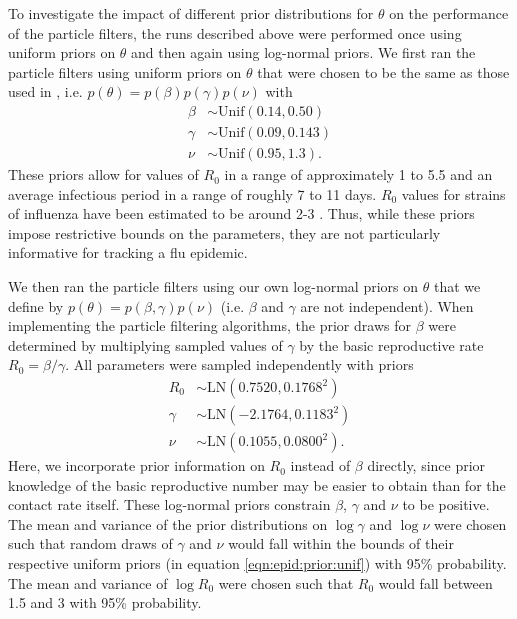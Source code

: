To investigate the impact of different prior distributions for $\theta$ on the performance of the particle filters, the runs described above were performed once using uniform priors on $\theta$ and then again using log-normal priors. We first ran the particle filters using uniform priors on $\theta$ that were chosen to be the same as those used in \citet{skvortsov2012monitoring}, i.e. $p(\theta) = p(\beta)p(\gamma)p(\nu)$ with
\begin{align}
\beta &\sim \mbox{Unif}(0.14, 0.50) \label{eqn:epid:prior:unif} \\
\gamma &\sim \mbox{Unif}(0.09, 0.143) \nonumber \\
\nu &\sim \mbox{Unif}(0.95, 1.3). \nonumber
\end{align}
These priors allow for values of $R_0$ in a range of approximately 1 to 5.5 and an average infectious period in a range of roughly 7 to 11 days. $R_0$ values for strains of influenza have been estimated to be around 2-3 \citep{mills2004influenza, heff2005repratio, zhang2011flu}. Thus, while these priors impose restrictive bounds on the parameters, they are not particularly informative for tracking a flu epidemic.

We then ran the particle filters using our own log-normal priors on $\theta$ that we define by $p(\theta) = p(\beta, \gamma)p(\nu)$ (i.e. $\beta$ and $\gamma$ are not independent). When implementing the particle filtering algorithms, the prior draws for $\beta$ were determined by multiplying sampled values of $\gamma$ by the basic reproductive rate $R_0 = \beta / \gamma$. All parameters were sampled independently with priors
\begin{align}
R_0 &\sim \mbox{LN}(0.7520, 0.1768^2) \label{eqn:epid:prior:ln} \\
\gamma &\sim \mbox{LN}(-2.1764, 0.1183^2) \nonumber \\
\nu &\sim \mbox{LN}(0.1055, 0.0800^2). \nonumber
\end{align}
Here, we incorporate prior information on $R_0$ instead of $\beta$ directly, since prior knowledge of the basic reproductive number may be easier to obtain than for the contact rate itself. These log-normal priors constrain $\beta$, $\gamma$ and $\nu$ to be positive. The mean and variance of the prior distributions on $\log \gamma$ and $\log \nu$ were chosen such that random draws of $\gamma$ and $\nu$ would fall within the bounds of their respective uniform priors (in equation \eqref{eqn:epid:prior:unif}) with 95\% probability. The mean and variance of $\log R_0$ were chosen such that $R_0$ would fall between 1.5 and 3 with 95\% probability.


